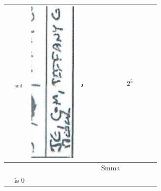 \documentclass[10pt]{article}
\begin{document}
\begin{center}
\begin{tabular}{|c|c|c|c|c|c|c|c|c|c|}
 & \({ }_{\text {and }}\) & \includegraphics[max width=\textwidth]{2025_02_27_dd68c3d38de88f0516d9g-070}
 & ， &  &  & \(2{ }^{5}\) &  \\
\hline
 &  &  &  &  & Smma &  &  &  &  \\
\hline
 & is 0 &  &  &  &  &  &  &  &  \\
\hline
\end{tabular}
\end{center}
\end{document}
